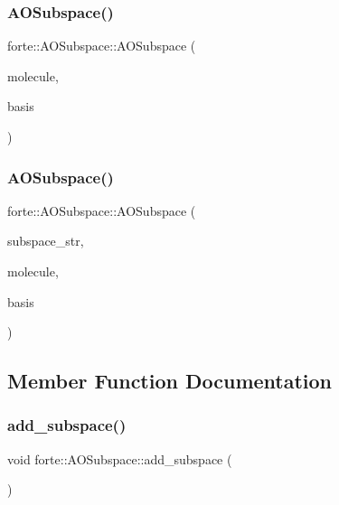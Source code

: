 \subsubsection{\texorpdfstring{A\+O\+Subspace()}{AOSubspace()}\hspace{0.1cm}{\footnotesize\ttfamily [1/2]}}
{\footnotesize\ttfamily forte\+::\+A\+O\+Subspace\+::\+A\+O\+Subspace (\begin{DoxyParamCaption}\item[{std\+::shared\+\_\+ptr$<$ psi\+::\+Molecule $>$}]{molecule,  }\item[{std\+::shared\+\_\+ptr$<$ psi\+::\+Basis\+Set $>$}]{basis }\end{DoxyParamCaption})}

\mbox{\label{classforte_1_1_a_o_subspace_a94a2f7faa860318be2fc22cacd073856}} 
\subsubsection{\texorpdfstring{A\+O\+Subspace()}{AOSubspace()}\hspace{0.1cm}{\footnotesize\ttfamily [2/2]}}
{\footnotesize\ttfamily forte\+::\+A\+O\+Subspace\+::\+A\+O\+Subspace (\begin{DoxyParamCaption}\item[{std\+::vector$<$ std\+::string $>$}]{subspace\+\_\+str,  }\item[{std\+::shared\+\_\+ptr$<$ psi\+::\+Molecule $>$}]{molecule,  }\item[{std\+::shared\+\_\+ptr$<$ psi\+::\+Basis\+Set $>$}]{basis }\end{DoxyParamCaption})}



\subsection{Member Function Documentation}
\mbox{\label{classforte_1_1_a_o_subspace_aa3be8bc3fec6b8a04b01f5f49fb56aa5}} 
\subsubsection{\texorpdfstring{add\+\_\+subspace()}{add\_subspace()}}
{\footnotesize\ttfamily void forte\+::\+A\+O\+Subspace\+::add\+\_\+subspace (\begin{DoxyParamCaption}\item[{std\+::string}]{ }\end{DoxyParamCaption})}

